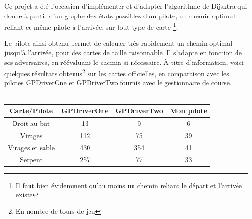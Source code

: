 \documentclass[a4paper,10pt]{article}
\begin{document}
\begin{itemize}
Ce projet a été l'occasion d'implémenter et d'adapter l'algorithme de Dijsktra qui donne à partir d'un graphe des états possibles d'un pilote, un chemin optimal reliant ce même pilote à l'arrivée, sur tout type de carte
\footnote{Il faut bien évidemment qu'au moins un chemin reliant le départ et l'arrivée existe}.

Le pilote ainsi obtenu permet de calculer très rapidement un chemin optimal jusqu'à l'arrivée, pour des cartes de taille raisonnable. Il s'adapte en fonction de ses adversaires, en réévaluant le chemin si nécessaire.
À titre d'information, voici quelques résultats obtenus\footnote{En nombre de tours de jeu} sur les cartes officielles, en comparaison avec les pilotes GPDriverOne et GPDriverTwo fournis avec le gestionnaire de course.
\\
\\
\begin{center}

\begin{tabular}{|c|c|c|c|}
  \hline
  Carte/Pilote& GPDriverOne & GPDriverTwo & Mon pilote \\
  \hline
  Droit au but &13 & 9 & 6 \\
  Virages &112 & 75 & 39 \\
  Virages et sable & 430 & 354& 41\\
  Serpent & 257 & 77& 33\\
  \hline
\end{tabular}
\end{center}


\end{itemize}
\end{document}
